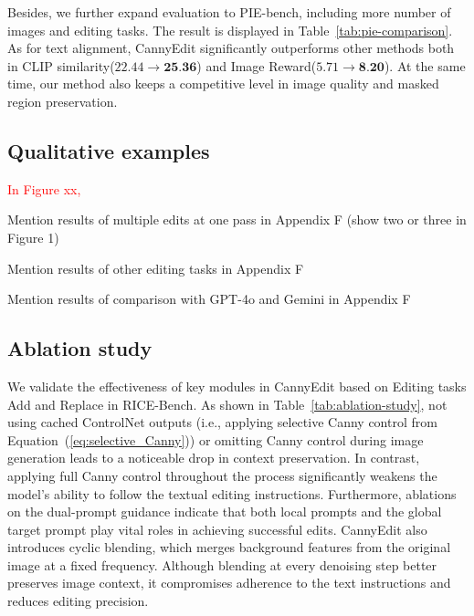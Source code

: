 \documentclass{article}
\begin{document}
Besides, we further expand evaluation to PIE-bench, including more number of images and editing tasks. The result is displayed in Table~\ref{tab:pie-comparison}. As for text alignment, CannyEdit significantly outperforms other methods both in CLIP similarity($22.44\rightarrow \textbf{25.36}$) and Image Reward($5.71\rightarrow \textbf{8.20}$). At the same time, our method also keeps a competitive level in image quality and masked region preservation. 

\subsection{Qualitative examples}

\textcolor{red}{In Figure xx, }





Mention results of multiple edits at one pass in Appendix F (show two or three in Figure 1)

Mention results of other editing tasks in Appendix F

Mention results of comparison with GPT-4o and Gemini in Appendix F



\subsection{Ablation study}

We validate the effectiveness of key modules in CannyEdit based on Editing tasks Add and Replace in RICE-Bench.  As shown in Table~\ref{tab:ablation-study}, not using cached ControlNet outputs (i.e., applying selective Canny control from Equation~(\ref{eq:selective_Canny})) or omitting Canny control during image generation leads to a noticeable drop in context preservation. In contrast, applying full Canny control throughout the process significantly weakens the model's ability to follow the textual editing instructions. Furthermore, ablations on the dual-prompt guidance indicate that both local prompts and the global target prompt play vital roles in achieving successful edits. CannyEdit also introduces cyclic blending, which merges background features from the original image at a fixed frequency. Although blending at every denoising step better preserves image context, it compromises adherence to the text instructions and reduces editing precision. 
\end{document}

